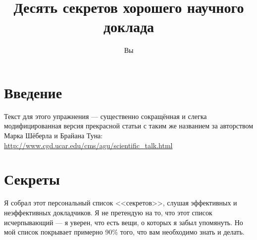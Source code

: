 \documentclass[12pt]{article}
\title{Десять секретов хорошего научного доклада}
\author{Вы}
\begin{document}
\maketitle

\section{Введение}

Текст для этого упражнения --- существенно сокращённая и слегка модифицированная версия прекрасной статьи с таким же названием за
авторством Марка Шёберла и Брайана Туна:
\url{http://www.cgd.ucar.edu/cms/agu/scientific_talk.html}

\section{Секреты}

Я собрал этот персональный список <<секретов>>, слушая эффективных и неэффективных докладчиков. Я не претендую на то, что этот
список исчерпывающий --- я уверен, что есть вещи, о которых я забыл упомянуть. Но мой список покрывает примерно 90\% того, что вам
необходимо знать и делать.
\end{document}
